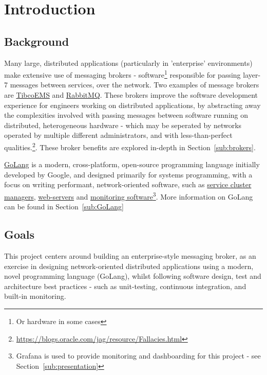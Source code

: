 \section{Introduction}
\label{sec:Introduction}

\subsection{Background}
\label{sub:Background}

Many large, distributed applications (particularly in 'enterprise' environments)
make extensive use of messaging brokers - software\footnote{Or hardware in some
cases\cite{solaceappliances}} responsible for passing layer-7 messages between
services, over the network. Two examples of message brokers are
\href{http://www.tibco.com/products/automation/enterprise-messaging/enterprise-message-service}{TibcoEMS}
and \href{https://www.rabbitmq.com/}{RabbitMQ}. These brokers improve the
software development experience for engineers working on distributed
applications, by abstracting away the complexities involved with passing
messages between software running on distributed, heterogeneous hardware - which
may be seperated by networks operated by multiple different administrators, and
with less-than-perfect
qualities.\footnote{\url{https://blogs.oracle.com/jag/resource/Fallacies.html}}. These broker benefits are explored in-depth in Section~\ref{sub:brokers}.

\href{https://golang.org/}{GoLang} is a modern, cross-platform, open-source
programming language initially developed by Google, and designed primarily for
systems programming, with a focus on writing performant, network-oriented
software, such as \href{https://github.com/kubernetes/kubernetes}{service
cluster managers}, \href{https://github.com/mholt/caddy}{web-servers} and
\href{https://github.com/grafana/grafana}{monitoring software}\footnote{Grafana
is used to provide monitoring and dashboarding for this project - see
Section~\ref{sub:presentation}}. More information on GoLang can be found in
Section~\ref{sub:GoLang}

\subsection{Goals}
This project centers around building an enterprise-style messaging broker,
as an exercise in designing network-oriented distributed applications using a modern, novel programming language (GoLang), whilst following software design, test and architecture best practices - such as unit-testing, continuous integration, and built-in monitoring.

